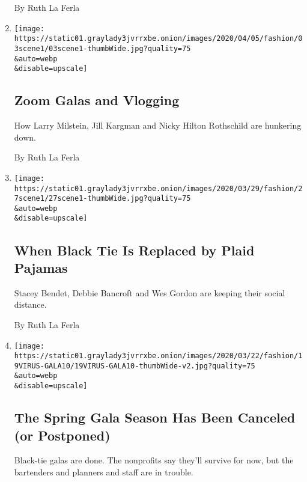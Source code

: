 \begin{enumerate}
  By Ruth La Ferla
\item
  \href{/2020/04/03/style/zoom-galas-and-vlogging.html}{}

  \texttt{[image: https://static01.graylady3jvrrxbe.onion/images/2020/04/05/fashion/03scene1/03scene1-thumbWide.jpg?quality=75\\\&auto=webp\\\&disable=upscale]}

  \hypertarget{zoom-galas-and-vlogging}{%
  \subsection{Zoom Galas and Vlogging}\label{zoom-galas-and-vlogging}}

  How Larry Milstein, Jill Kargman and Nicky Hilton Rothschild are
  hunkering down.

  By Ruth La Ferla
\item
  \href{/2020/03/27/style/when-black-tie-is-replaced-by-plaid-pajamas.html}{}

  \texttt{[image: https://static01.graylady3jvrrxbe.onion/images/2020/03/29/fashion/27scene1/27scene1-thumbWide.jpg?quality=75\\\&auto=webp\\\&disable=upscale]}

  \hypertarget{when-black-tie-is-replaced-by-plaid-pajamas}{%
  \subsection{When Black Tie Is Replaced by Plaid
  Pajamas}\label{when-black-tie-is-replaced-by-plaid-pajamas}}

  Stacey Bendet, Debbie Bancroft and Wes Gordon are keeping their social
  distance.

  By Ruth La Ferla
\item
  \href{/2020/03/19/fashion/gala-philanthropy-charity-parties-canceled-coronavirus.html}{}

  \texttt{[image: https://static01.graylady3jvrrxbe.onion/images/2020/03/22/fashion/19VIRUS-GALA10/19VIRUS-GALA10-thumbWide-v2.jpg?quality=75\\\&auto=webp\\\&disable=upscale]}

  \hypertarget{the-spring-gala-season-has-been-canceled-or-postponed}{%
  \subsection{The Spring Gala Season Has Been Canceled (or
  Postponed)}\label{the-spring-gala-season-has-been-canceled-or-postponed}}

  Black-tie galas are done. The nonprofits say they'll survive for now,
  but the bartenders and planners and staff are in trouble.


\end{enumerate}
